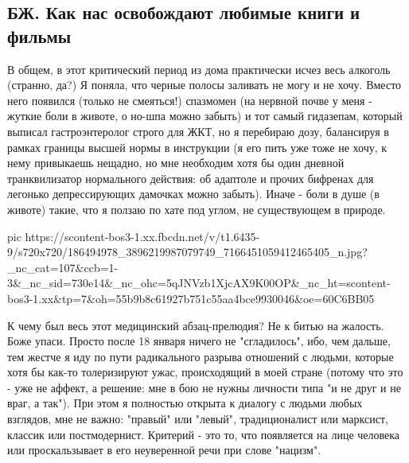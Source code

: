  
 
 
 
 
\subsection{БЖ. Как нас освобождают любимые книги и фильмы}
\label{sec:16_05_2021.fb.bilchenko_evgenia.2.knigi_filmy_osvobozhdenie}

В общем, в этот критический период из дома практически исчез весь алкоголь
(странно, да?) Я поняла, что черные полосы заливать не могу и не хочу. Вместо
него появился (только не смеяться!) спазмомен (на нервной почве у меня - жуткие
боли в животе, о но-шпа можно забыть) и тот самый гидазепам, который выписал
гастроэнтеролог строго для ЖКТ, но я перебираю дозу, балансируя в рамках
границы высшей нормы в инструкции (я его пить уже тоже не хочу, к нему
привыкаешь нещадно, но мне необходим хотя бы один дневной транквилизатор
нормального действия: об адаптоле и прочих бифренах для легонько депрессирующих
дамочках можно забыть). Иначе - боли в душе (в животе) такие, что я ползаю по
хате под углом, не существующем в природе. 

\ifcmt
  pic https://scontent-bos3-1.xx.fbcdn.net/v/t1.6435-9/s720x720/186494978_3896219987079749_7166451059412465405_n.jpg?_nc_cat=107&ccb=1-3&_nc_sid=730e14&_nc_ohc=5qJNVzb1XjcAX9K00OP&_nc_ht=scontent-bos3-1.xx&tp=7&oh=55b9b8c61927b751c55aa4bce9930046&oe=60C6BB05
\fi

К чему был весь этот медицинский абзац-прелюдия? Не к битью на жалость. Боже
упаси. Просто после 18 января ничего не "сгладилось", ибо, чем дальше, тем
жестче я иду по пути радикального разрыва отношений с людьми, которые хотя бы
как-то толеризируют ужас, происходящий в моей стране (потому что это - уже не
аффект, а решение: мне в бою не нужны личности типа "и не друг и не враг, а
так"). При этом я полностью открыта к диалогу с людьми любых взглядов, мне не
важно: "правый" или "левый", традиционалист или марксист, классик или
постмодернист. Критерий - это то, что появляется на лице человека или
проскальзывает в его неуверенной речи при слове "нацизм". 

